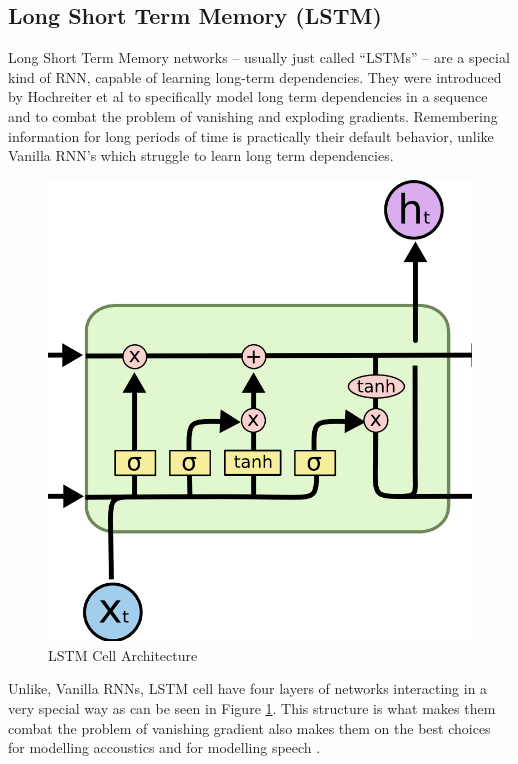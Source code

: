 \documentclass[letterpaper, 12 pt, conference]{ieeeconf}  %
\begin{document}
\subsection{Long Short Term Memory (LSTM)}
Long Short Term Memory networks – usually just called “LSTMs” – are a special kind of RNN, capable of learning long-term dependencies. They were introduced by Hochreiter et al \cite{lstm_intro} to specifically model long term dependencies in a sequence and to combat the problem of vanishing and exploding gradients. Remembering information for long periods of time is practically their default behavior, unlike Vanilla RNN's which struggle to learn long term dependencies.

\begin{figure}[!h]
\centering
\includegraphics[scale=0.40]{../figs/lstm/diagram.png}	
\caption{LSTM Cell Architecture}
\label{fig:LSTM_Arch} 
\end{figure}

Unlike, Vanilla RNNs, LSTM cell \cite{lstm_intro} have four layers of networks interacting in a very special way as can be seen in Figure \ref{fig:LSTM_Arch}. This structure is what makes them combat the problem of vanishing gradient also makes them on the best choices for modelling accoustics \cite{google_accoustics} and for modelling speech \cite{google_speech}.
\end{document}
